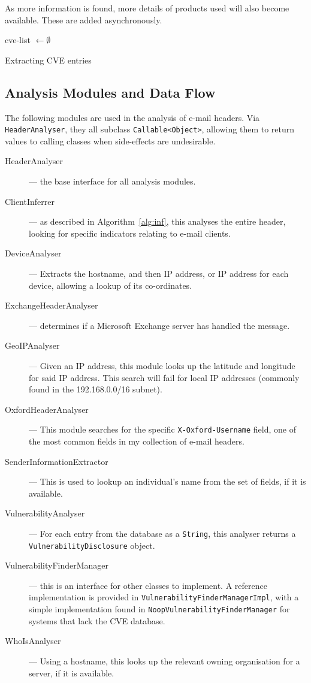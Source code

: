 As more information is found, more details of products used will also become
available.  These are added asynchronously.

\begin{algorithm}[!ht]
	cve-list $\gets\emptyset$\;
	\;
	\caption{Extracting CVE entries}
\end{algorithm}

\subsection{Analysis Modules and Data Flow}

The following modules are used in the analysis of e-mail headers. Via \texttt{HeaderAnalyser}, they all subclass \texttt{Callable<Object>}, allowing them to return values to calling classes when side-effects are undesirable.

\begin{description}
	\item[HeaderAnalyser] --- the base interface for all analysis modules.
	\item[ClientInferrer] --- as described in Algorithm~\ref{alg:inf}, this analyses the entire header, looking for specific indicators relating to e-mail clients.
	\item[DeviceAnalyser] --- Extracts the hostname, and then IP address, or IP address for each device, allowing a lookup of its co-ordinates.
	\item[ExchangeHeaderAnalyser] --- determines if a Microsoft Exchange server has handled the message.
	\item[GeoIPAnalyser] --- Given an IP address, this module looks up the latitude and longitude for said IP address.  This search will fail for local IP addresses (commonly found in the 192.168.0.0/16 subnet).
	\item[OxfordHeaderAnalyser] --- This module searches for the specific \texttt{X-Oxford-Username} field, one of the most common fields in my collection of e-mail headers.
	\item[SenderInformationExtractor] --- This is used to lookup an individual's name from the set of fields, if it is available.
	\item[VulnerabilityAnalyser] --- For each entry from the database as a \texttt{String}, this analyser returns a \texttt{VulnerabilityDisclosure} object.
	\item[VulnerabilityFinderManager] --- this is an interface for other classes to implement. A reference implementation is provided in \texttt{VulnerabilityFinderManagerImpl}, with a simple implementation found in \texttt{NoopVulnerabilityFinderManager} for systems that lack the CVE database.
	\item[WhoIsAnalyser] --- Using a hostname, this looks up the relevant owning organisation for a server, if it is available.
\end{description}

